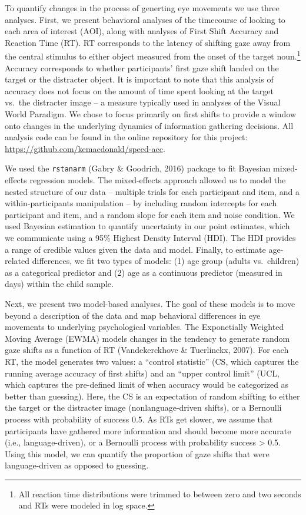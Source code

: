 \documentclass[english,floatsintext,man]{apa6}
\begin{document}
To quantify changes in the process of generting eye movements we use
three analyses. First, we present behavioral analyses of the timecourse
of looking to each area of interest (AOI), along with analyses of First
Shift Accuracy and Reaction Time (RT). RT corresponds to the latency of
shifting gaze away from the central stimulus to either object measured
from the onset of the target noun.\footnote{All reaction time
  distributions were trimmed to between zero and two seconds and RTs
  were modeled in log space.} Accuracy corresponds to whether
participants' first gaze shift landed on the target or the distracter
object. It is important to note that this analysis of accuracy does not
focus on the amount of time spent looking at the target vs.~the
distracter image -- a measure typically used in analyses of the Visual
World Paradigm. We chose to focus primarily on first shifts to provide a
window onto changes in the underlying dynamics of information gathering
decisions. All analysis code can be found in the online repository for
this project: \url{https://github.com/kemacdonald/speed-acc}.

We used the \texttt{rstanarm} (Gabry \& Goodrich, 2016) package to fit
Bayesian mixed-effects regression models. The mixed-effects approach
allowed us to model the nested structure of our data -- multiple trials
for each participant and item, and a within-participants manipulation --
by including random intercepts for each participant and item, and a
random slope for each item and noise condition. We used Bayesian
estimation to quantify uncertainty in our point estimates, which we
communicate using a 95\% Highest Density Interval (HDI). The HDI
provides a range of credible values given the data and model. Finally,
to estimate age-related differences, we fit two types of models: (1) age
group (adults vs.~children) as a categorical predictor and (2) age as a
continuous predictor (measured in days) within the child sample.

Next, we present two model-based analyses. The goal of these models is
to move beyond a description of the data and map behavioral differences
in eye movements to underlying psychological variables. The Exponetially
Weighted Moving Average (EWMA) models changes in the tendency to
generate random gaze shifts as a function of RT (Vandekerckhove \&
Tuerlinckx, 2007). For each RT, the model generates two values: a
\enquote{control statistic} (CS, which captures the running average
accuracy of first shifts) and an \enquote{upper control limit} (UCL,
which captures the pre-defined limit of when accuracy would be
categorized as better than guessing). Here, the CS is an expectation of
random shifting to either the target or the distracter image
(nonlanguage-driven shifts), or a Bernoulli process with probability of
success 0.5. As RTs get slower, we assume that participants have
gathered more information and should become more accurate (i.e.,
language-driven), or a Bernoulli process with probability success
\textgreater{} 0.5. Using this model, we can quantify the proportion of
gaze shifts that were language-driven as opposed to guessing.
\end{document}
